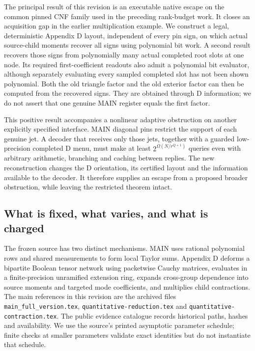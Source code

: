\documentclass[
  11pt,
]{article}
\begin{document}
The principal result of this revision is an executable native escape on
the common pinned CNF family used in the preceding rank-budget work. It
closes an acquisition gap in the earlier multiplication example. We
construct a legal, deterministic Appendix D layout, independent of every
pin sign, on which actual source-child moments recover all signs using
polynomial bit work. A second result recovers those signs from
polynomially many actual completed root slots at one node. Its required
first-coefficient readouts also admit a polynomial bit evaluator,
although separately evaluating every sampled completed slot has not been
shown polynomial. Both the old triangle factor and the old exterior
factor can then be computed from the recovered signs. They are obtained
through D information; we do not assert that one genuine MAIN register
equals the first factor.

This positive result accompanies a nonlinear adaptive obstruction on
another explicitly specified interface. MAIN diagonal pins restrict the
support of each genuine jet. A decoder that receives only those jets,
together with a guarded low-precision completed D menu, must make at
least \(2^{\Omega(N/r^{Q+1})}\) queries even with arbitrary arithmetic,
branching and caching between replies. The new reconstruction changes
the D orientation, its certified layout and the information available to
the decoder. It therefore supplies an escape from a proposed broader
obstruction, while leaving the restricted theorem intact.

\subsection{What is fixed, what varies, and what is
charged}\label{v9-what-is-fixed-what-varies-and-what-is-charged}

The frozen source has two distinct mechanisms. MAIN uses rational
polynomial rows and shared measurements to form local Taylor sums.
Appendix D deforms a bipartite Boolean tensor network using packetwise
Cauchy matrices, evaluates in a finite-precision unramified extension
ring, expands cross-group dependence into source moments and targeted
mode coefficients, and multiplies child contractions. The main
references in this revision are the archived files
\nolinkurl{main_full_version.tex},
\nolinkurl{quantitative-reduction.tex} and
\nolinkurl{quantitative-contraction.tex}. The public evidence catalogue
records historical paths, hashes and availability. We use the source's
printed asymptotic parameter schedule; finite checks at smaller
parameters validate exact identities but do not instantiate that
schedule.
\end{document}

